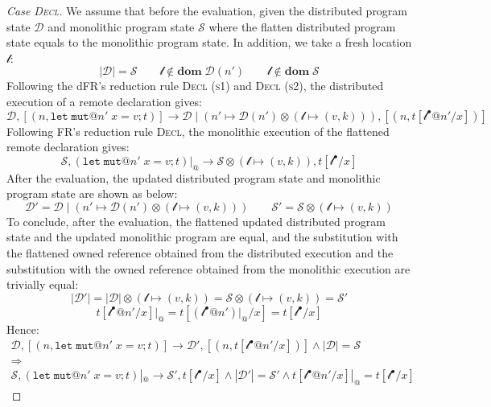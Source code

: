 \begin{proof}[Case \textsc{\emph{Decl}}]
We assume that before the evaluation, given the distributed program state $\mathcal{D}$ and monolithic program state $\mathcal{S}$ where the flatten distributed program state equals to the monolithic program state. In addition, we take a fresh location $\mathscr{l}$:
\[
|\mathcal{D}| = \mathcal{S} \quad\quad \mathscr{l} \notin \textbf{dom}\; \mathcal{D}(n') \quad\quad \mathscr{l} \notin \textbf{dom}\; \mathcal{S}
\]
Following the dFR's reduction rule \textsc{Decl (s1)} and \textsc{Decl (s2)}, the distributed execution of a remote declaration gives:
\[
\mathcal{D}, [(n, \texttt{let}\;\texttt{mut}@n'\;x = v;t)] \longrightarrow \mathcal{D} \mid (n' \mapsto \mathcal{D}(n')\otimes(\mathscr{l} \mapsto (v, k))), [(n, t[\mathscr{l}^\bullet@n'/x])]
\]
Following FR's reduction rule \textsc{Decl}, the monolithic execution of the flattened remote declaration gives:
\[
\mathcal{S}, (\texttt{let}\;\texttt{mut}@n'\;x = v;t)|_@ \longrightarrow \mathcal{S} \otimes (\mathscr{l} \mapsto (v, k)), t[\mathscr{l}^\bullet/x]
\]
After the evaluation, the updated distributed program state and monolithic program state are shown as below:
\[
\mathcal{D}' = \mathcal{D} \mid (n' \mapsto \mathcal{D}(n')\otimes(\mathscr{l} \mapsto (v, k))) \quad\quad
\mathcal{S}' = \mathcal{S} \otimes (\mathscr{l} \mapsto (v, k))
\]
To conclude, after the evaluation, the flattened updated distributed program state and the updated monolithic program are equal, and the substitution with the flattened owned reference obtained from the distributed execution and the substitution with the owned reference obtained from the monolithic execution are trivially equal:
\[
|\mathcal{D}'| = |\mathcal{D}| \otimes (\mathscr{l} \mapsto (v, k)) = \mathcal{S} \otimes (\mathscr{l} \mapsto (v, k)) = \mathcal{S}'\]\[ t[\mathscr{l}^\bullet@n'/x]|_@ = t[(\mathscr{l}^\bullet@n')|_@/x] = t[\mathscr{l}^\bullet/x]
\]
Hence:
\begin{gather*}
\mathcal{D}, [(n, \texttt{let}\;\texttt{mut}@n'\;x = v;t)] \longrightarrow \mathcal{D'}, [(n, t[\mathscr{l}^\bullet@n'/x])] \land |\mathcal{D}| = \mathcal{S} \\\Rightarrow\\ \mathcal{S}, (\texttt{let}\;\texttt{mut}@n'\;x = v;t)|_@ \longrightarrow \mathcal{S'}, t[\mathscr{l}^\bullet/x] \land |\mathcal{D}'| = \mathcal{S}' \land t[\mathscr{l}^\bullet@n'/x]|_@ = t[\mathscr{l}^\bullet/x]
\end{gather*}

\end{proof}
